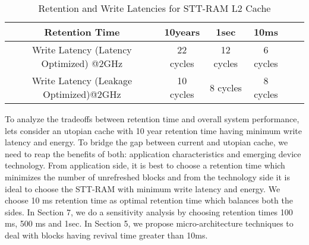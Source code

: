 \begin{table*}[t]
  \centering
  \caption{Retention and Write Latencies for STT-RAM L2 Cache}
  \label{table:rt-wt}
  \begin{tabular}{| c | c | c | c | c | c |}
  	\hline
	 Retention Time & 10years & 1sec &10ms \\
	\hline
	Write Latency (Latency Optimized) @2GHz & 22 cycles & 12 cycles & 6 cycles \\
	\hline
	Write Latency (Leakage Optimized)@2GHz & 10 cycles & 8 cycles & 8 cycles \\
	\hline
  \end{tabular}
\end{table*}

To analyze the tradeoffs between retention time and overall system performance, lets consider an utopian cache with 10 year retention time having minimum write latency and energy.  To bridge the gap between current and utopian cache, we need to reap the benefits of both: application characteristics and emerging device technology. From application side, it is best to choose a retention time which minimizes the number of unrefreshed blocks and from the technology side it is ideal to choose the STT-RAM with minimum write latency and energy. We choose 10 ms retention time as optimal retention time which balances both the sides. In Section 7, we do a sensitivity analysis by choosing retention times 100 ms, 500 ms and 1sec. In Section 5, we propose micro-architecture techniques to deal with blocks having revival time greater than 10ms. 




 
  


